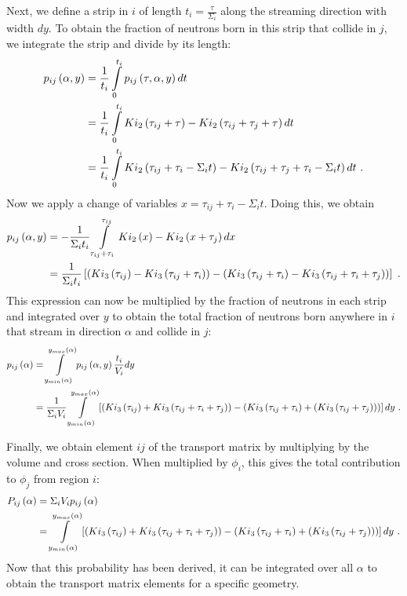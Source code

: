 Next, we define a strip in $i$ of length $t_i = \frac{\tau}{\Sigma_i}$ along the streaming direction with width $dy$.  To obtain the fraction of neutrons born in this strip that collide in $j$, we integrate the strip and divide by its length:
\begin{align}
p_{ij}\left(\alpha, y\right) &= \frac{1}{t_i} \intop_0^{t_i} p_{ij}\left(\tau, \alpha, y\right) dt \nonumber \\
&= \frac{1}{t_i} \intop_0^{t_i} Ki_2\left(\tau_{ij} + \tau\right) - Ki_2\left(\tau_{ij} + \tau_j + \tau\right) dt \nonumber \\
&= \frac{1}{t_i} \intop_0^{t_i} Ki_2\left(\tau_{ij} + \tau_i - \Sigma_i t\right) - Ki_2\left(\tau_{ij} + \tau_j + \tau_i - \Sigma_i t\right) dt\ .
\end{align}
Now we apply a change of variables $x=\tau_{ij} + \tau_i - \Sigma_i t$.  Doing this, we obtain
\begin{align}
p_{ij}\left(\alpha, y\right) &= -\frac{1}{\Sigma_i t_i} \intop_{\tau_{ij} + \tau_i}^{\tau_{ij}} Ki_2\left(x\right) - Ki_2\left(x + \tau_j\right) dx \nonumber \\
&= \frac{1}{\Sigma_i t_i} \left[\left(Ki_3\left(\tau_{ij}\right) - Ki_3\left(\tau_{ij} + \tau_i\right)\right) - \left(Ki_3\left(\tau_{ij} + \tau_i\right) - Ki_3\left(\tau_{ij} + \tau_i + \tau_j\right)\right)\right]\ .
\end{align}
This expression can now be multiplied by the fraction of neutrons in each strip and integrated over $y$ to obtain the total fraction of neutrons born anywhere in $i$ that stream in direction $\alpha$ and collide in $j$:
\begin{align}
p_{ij}\left(\alpha\right) &= \intop_{y_{min}\left(\alpha\right)}^{y_{max}\left(\alpha\right)} p_{ij}\left(\alpha,y\right) \frac{t_i}{V_i} dy \nonumber\\
&= \frac{1}{\Sigma_i V_i} \intop_{y_{min}\left(\alpha\right)}^{y_{max}\left(\alpha\right)} \left[\left(Ki_3\left(\tau_{ij}\right) + Ki_3\left(\tau_{ij} + \tau_i + \tau_j\right)\right) - \left(Ki_3\left(\tau_{ij} + \tau_i\right) + \left(Ki_3\left(\tau_{ij} + \tau_j\right)\right)\right)\right] dy\ .
\end{align}

Finally, we obtain element $ij$ of the transport matrix by multiplying by the volume and cross section.  When multiplied by $\phi_i$, this gives the total contribution to $\phi_j$ from region $i$:
\begin{align}\label{e:CPPij}
P_{ij}\left(\alpha\right) &= \Sigma_i V_i p_{ij}\left(\alpha\right) \nonumber \\
&= \intop_{y_{min}\left(\alpha\right)}^{y_{max}\left(\alpha\right)} \left[\left(Ki_3\left(\tau_{ij}\right) + Ki_3\left(\tau_{ij} + \tau_i + \tau_j\right)\right) - \left(Ki_3\left(\tau_{ij} + \tau_i\right) + \left(Ki_3\left(\tau_{ij} + \tau_j\right)\right)\right)\right] dy\ .
\end{align}
Now that this probability has been derived, it can be integrated over all $\alpha$ to obtain the transport matrix elements for a specific geometry.

